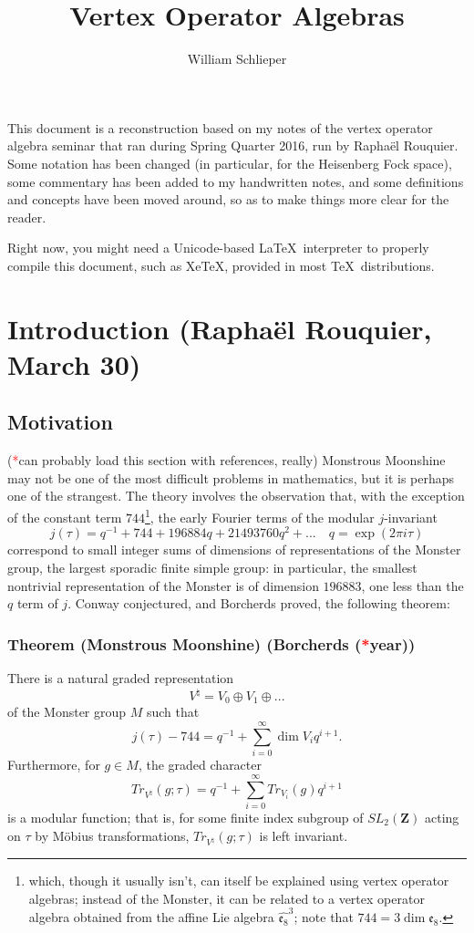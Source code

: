 \documentclass{article}
\author{William Schlieper}
\title{Vertex Operator Algebras}
\newcommand{\ZZ}{\mathbold{Z}}
\newcommand{\tk}{\textcolor{red}{*}}
\begin{document}
\maketitle
This document is a reconstruction based on my notes of the vertex operator algebra seminar that ran during Spring Quarter 2016, run by Raphaël Rouquier.  Some notation has been changed (in particular, for the Heisenberg Fock space), some commentary has been added to my handwritten notes, and some definitions and concepts have been moved around, so as to make things more clear for the reader.

Right now, you might need a Unicode-based \LaTeX\ interpreter to properly compile this document, such as XeTeX, provided in most \TeX\ distributions.
\tableofcontents

\section{Introduction (Raphaël Rouquier, March 30)}
\label{sec:intro}

\subsection{Motivation}
\label{sec:mot}
(\tk can probably load this section with references, really)
Monstrous Moonshine may not be one of the most difficult problems in mathematics, but it is perhaps one of the strangest.  The theory involves the observation that, with the exception of the constant term $744$\footnote{which, though it usually isn't, can itself be explained using vertex operator algebras; instead of the Monster, it can be related to a vertex operator algebra obtained from the affine Lie algebra $\widehat{\mathfrak{e}_8}^3$; note that $744=3 \dim \mathfrak{e}_8$.}, the early Fourier terms of the modular $j$-invariant
\[j(\tau)=q^{-1}+744+196884q+21493760q^2+... \quad q=\exp(2 \pi i \tau)\]
correspond to small integer sums of dimensions of representations of the Monster group, the largest sporadic finite simple group: in particular, the smallest nontrivial representation of the Monster is of dimension $196883$, one less than the $q$ term of $j$.  Conway conjectured, and Borcherds proved, the following theorem:
\subsubsection{Theorem (Monstrous Moonshine) (Borcherds (\tk year))}
\label{sec:monmoon}
There is a natural graded representation
\[V^\natural = V_0 \oplus V_1 \oplus ... \]
of the Monster group $M$ such that
\[j(\tau)-744=q^{-1}+\sum_{i=0}^{\infty} \dim V_i q^{i+1}. \]
Furthermore, for $g \in M$, the graded character
\[Tr_{V^\natural}(g;\tau)=q^{-1}+\sum_{i=0}^{\infty} Tr_{V_i}(g) q^{i+1} \]
is a modular function; that is, for some finite index subgroup of $SL_2(\ZZ)$ acting on $\tau$ by Möbius transformations, $Tr_{V^\natural}(g;\tau)$ is left invariant.
\end{document}
